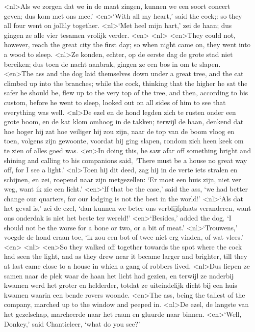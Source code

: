<nl>Als we zorgen dat we in de maat zingen, kunnen we een soort concert geven; dus kom met ons mee.'
<en>`With all my heart,' said the cock;: so they all four went on jollily together.
<nl>`Met heel mijn hart,' zei de haan; dus gingen ze alle vier tesamen vrolijk verder.
<en>
<nl>
<en>They could not, however, reach the great city the first day; so when night came on, they went into a wood to sleep.
<nl>Ze konden, echter, op de eerste dag de grote stad niet bereiken; dus toen de nacht aanbrak, gingen ze een bos in om te slapen.
<en>The ass and the dog laid themselves down under a great tree, and the cat climbed up into the branches; while the cock, thinking that the higher he sat the safer he should be, flew up to the very top of the tree, and then, according to his custom, before he went to sleep, looked out on all sides of him to see that everything was well.
<nl>De ezel en de hond legden zich te rusten onder een grote boom, en de kat klom omhoog in de takken; terwijl de haan, denkend dat hoe hoger hij zat hoe veiliger hij zou zijn, naar de top van de boom vloog en toen, volgens zijn gewoonte, voordat hij ging slapen, rondom zich heen keek om te zien of alles goed was.
<en>In doing this, he saw afar off something bright and shining and calling to his companions said, `There must be a house no great way off, for I see a light.'
<nl>Toen hij dit deed, zag hij in de verte iets stralen en schijnen, en zei, roepend naar zijn metgezellen: `Er moet een huis zijn, niet ver weg, want ik zie een licht.'
<en>`If that be the case,' said the ass, `we had better change our quarters, for our lodging is not the best in the world!'
<nl>`Als dat het geval is,' zei de ezel, `dan kunnen we beter ons verblijfplaats veranderen, want ons onderdak is niet het beste ter wereld!'
<en>`Besides,' added the dog, `I should not be the worse for a bone or two, or a bit of meat.'
<nl>`Trouwens,' voegde de hond eraan toe, `ik zou  een bot of twee niet erg vinden, of wat vlees.'
<en>
<nl>
<en>So they walked off together towards the spot where the cock had seen the light, and as they drew near it became larger and brighter, till they at last came close to a house in which a gang of robbers lived.
<nl>Dus liepen ze samen naar de plek waar de haan het licht had gezien, en terwijl ze naderbij kwamen werd het groter en helderder, totdat ze uiteindelijk dicht bij een huis kwamen waarin een bende rovers woonde.
<en>The ass, being the tallest of the company, marched up to the window and peeped in.
<nl>De ezel, de langste van het gezelschap, marcheerde naar het raam en gluurde naar binnen.
<en>`Well, Donkey,' said Chanticleer, `what do you see?'

